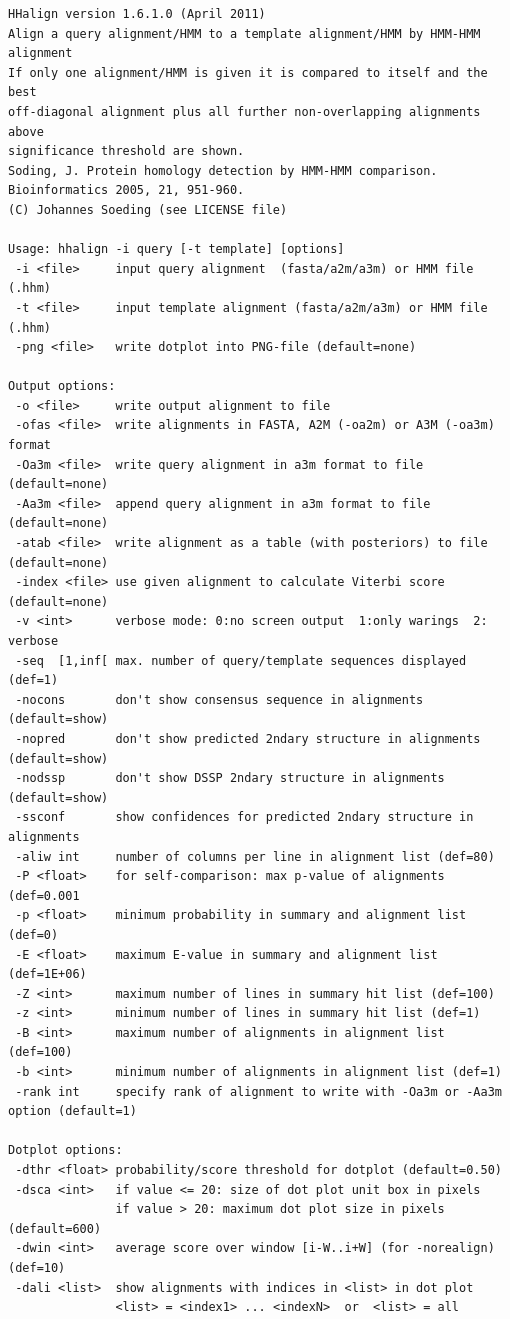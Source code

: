 \documentclass[11pt,a4paper]{article}
\begin{document}
\small \begin{verbatim}
HHalign version 1.6.1.0 (April 2011)
Align a query alignment/HMM to a template alignment/HMM by HMM-HMM alignment
If only one alignment/HMM is given it is compared to itself and the best
off-diagonal alignment plus all further non-overlapping alignments above 
significance threshold are shown.
Soding, J. Protein homology detection by HMM-HMM comparison. Bioinformatics 2005, 21, 951-960.
(C) Johannes Soeding (see LICENSE file)

Usage: hhalign -i query [-t template] [options]  
 -i <file>     input query alignment  (fasta/a2m/a3m) or HMM file (.hhm)
 -t <file>     input template alignment (fasta/a2m/a3m) or HMM file (.hhm)
 -png <file>   write dotplot into PNG-file (default=none)           

Output options:                                                           
 -o <file>     write output alignment to file
 -ofas <file>  write alignments in FASTA, A2M (-oa2m) or A3M (-oa3m) format   
 -Oa3m <file>  write query alignment in a3m format to file (default=none)
 -Aa3m <file>  append query alignment in a3m format to file (default=none)
 -atab <file>  write alignment as a table (with posteriors) to file (default=none)
 -index <file> use given alignment to calculate Viterbi score (default=none)
 -v <int>      verbose mode: 0:no screen output  1:only warings  2: verbose
 -seq  [1,inf[ max. number of query/template sequences displayed  (def=1)  
 -nocons       don't show consensus sequence in alignments (default=show) 
 -nopred       don't show predicted 2ndary structure in alignments (default=show) 
 -nodssp       don't show DSSP 2ndary structure in alignments (default=show) 
 -ssconf       show confidences for predicted 2ndary structure in alignments
 -aliw int     number of columns per line in alignment list (def=80)
 -P <float>    for self-comparison: max p-value of alignments (def=0.001
 -p <float>    minimum probability in summary and alignment list (def=0) 
 -E <float>    maximum E-value in summary and alignment list (def=1E+06)     
 -Z <int>      maximum number of lines in summary hit list (def=100)       
 -z <int>      minimum number of lines in summary hit list (def=1)       
 -B <int>      maximum number of alignments in alignment list (def=100)    
 -b <int>      minimum number of alignments in alignment list (def=1)    
 -rank int     specify rank of alignment to write with -Oa3m or -Aa3m option (default=1)

Dotplot options:
 -dthr <float> probability/score threshold for dotplot (default=0.50)        
 -dsca <int>   if value <= 20: size of dot plot unit box in pixels           
               if value > 20: maximum dot plot size in pixels (default=600)   
 -dwin <int>   average score over window [i-W..i+W] (for -norealign) (def=10)
 -dali <list>  show alignments with indices in <list> in dot plot            
               <list> = <index1> ... <indexN>  or  <list> = all              


\end{verbatim}
\end{document}

